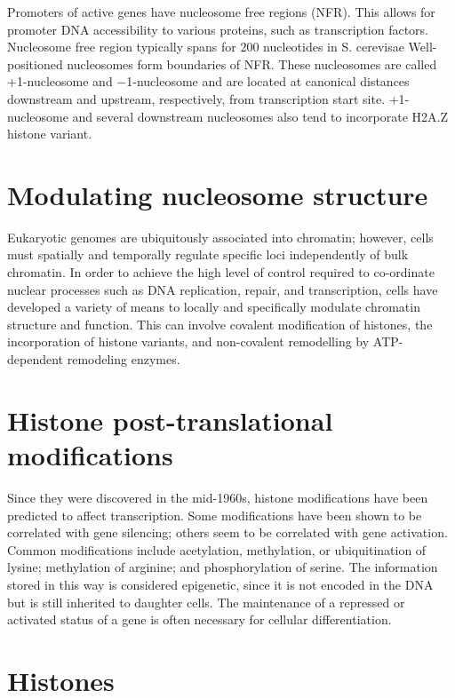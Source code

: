 Promoters of active genes have nucleosome free regions (NFR). This allows for promoter DNA accessibility to various proteins, such as transcription factors. Nucleosome free region typically spans for 200 nucleotides in S. cerevisae Well-positioned nucleosomes form boundaries of NFR. These nucleosomes are called +1-nucleosome and −1-nucleosome and are located at canonical distances downstream and upstream, respectively, from transcription start site. +1-nucleosome and several downstream nucleosomes also tend to incorporate H2A.Z histone variant.

\hypertarget{modulating-nucleosome-structure}{%
\section{Modulating nucleosome structure}\label{modulating-nucleosome-structure}}

Eukaryotic genomes are ubiquitously associated into chromatin; however, cells must spatially and temporally regulate specific loci independently of bulk chromatin. In order to achieve the high level of control required to co-ordinate nuclear processes such as DNA replication, repair, and transcription, cells have developed a variety of means to locally and specifically modulate chromatin structure and function. This can involve covalent modification of histones, the incorporation of histone variants, and non-covalent remodelling by ATP-dependent remodeling enzymes.

\hypertarget{histone-post-translational-modifications}{%
\section{Histone post-translational modifications}\label{histone-post-translational-modifications}}

Since they were discovered in the mid-1960s, histone modifications have been predicted to affect transcription. Some modifications have been shown to be correlated with gene silencing; others seem to be correlated with gene activation. Common modifications include acetylation, methylation, or ubiquitination of lysine; methylation of arginine; and phosphorylation of serine. The information stored in this way is considered epigenetic, since it is not encoded in the DNA but is still inherited to daughter cells. The maintenance of a repressed or activated status of a gene is often necessary for cellular differentiation.

\hypertarget{histones}{%
\section{Histones}\label{histones}}

